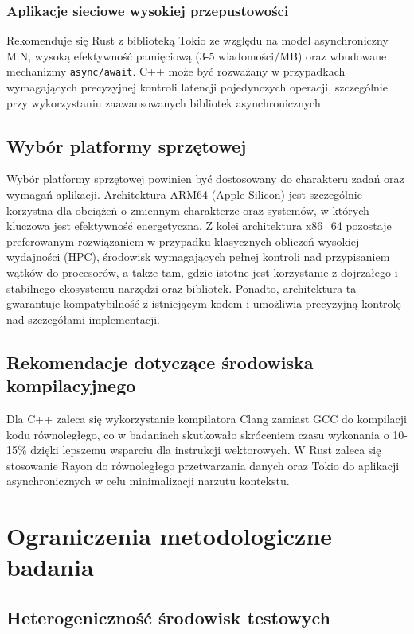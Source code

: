 \subsubsection{Aplikacje sieciowe wysokiej przepustowości}

Rekomenduje się Rust z biblioteką Tokio ze względu na model asynchroniczny M:N, wysoką efektywność pamięciową (3-5 wiadomości/MB) oraz wbudowane mechanizmy \texttt{async/await}. C++ może być rozważany w przypadkach wymagających precyzyjnej kontroli latencji pojedynczych operacji, szczególnie przy wykorzystaniu zaawansowanych bibliotek asynchronicznych.

\subsection{Wybór platformy sprzętowej}

Wybór platformy sprzętowej powinien być dostosowany do charakteru zadań oraz wymagań aplikacji. Architektura ARM64 (Apple Silicon) jest szczególnie korzystna dla obciążeń o zmiennym charakterze oraz systemów, w których kluczowa jest efektywność energetyczna. Z kolei architektura x86\_64 pozostaje preferowanym rozwiązaniem w przypadku klasycznych obliczeń wysokiej wydajności (HPC), środowisk wymagających pełnej kontroli nad przypisaniem wątków do procesorów, a także tam, gdzie istotne jest korzystanie z dojrzałego i stabilnego ekosystemu narzędzi oraz bibliotek. Ponadto, architektura ta gwarantuje kompatybilność z istniejącym kodem  i umożliwia precyzyjną kontrolę nad szczegółami implementacji.

\subsection{Rekomendacje dotyczące środowiska kompilacyjnego}

Dla C++ zaleca się wykorzystanie kompilatora Clang zamiast GCC do kompilacji kodu równoległego, co w badaniach skutkowało skróceniem czasu wykonania o 10-15\% dzięki lepszemu wsparciu dla instrukcji wektorowych. W Rust zaleca się stosowanie Rayon do równoległego przetwarzania danych oraz Tokio do aplikacji asynchronicznych w celu minimalizacji narzutu kontekstu.

\section{Ograniczenia metodologiczne badania}

\subsection{Heterogeniczność środowisk testowych}


